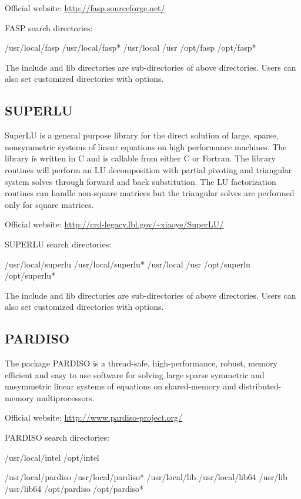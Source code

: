 Official website: \url{http://fasp.sourceforge.net/}

FASP search directories:
\begin{evb}
/usr/local/fasp
/usr/local/fasp*
/usr/local
/usr
/opt/fasp 
/opt/fasp*
\end{evb}
The include and lib directories are sub-directories of above directories. Users can also set customized directories with options.

\subsection{SUPERLU}
SuperLU is a general purpose library for the direct solution of large, sparse, nonsymmetric systems of linear equations on high performance machines. The library is written in C and is callable from either C or Fortran. The library routines will perform an LU decomposition with partial pivoting and triangular system solves through forward and back substitution. The LU factorization routines can handle non-square matrices but the triangular solves are performed only for square matrices.

Official website: \url{http://crd-legacy.lbl.gov/~xiaoye/SuperLU/}

SUPERLU search directories:
\begin{evb}
/usr/local/superlu
/usr/local/superlu*
/usr/local
/usr
/opt/superlu 
/opt/superlu*
\end{evb}

The include and lib directories are sub-directories of above directories. Users can also set customized directories with options.

\subsection{PARDISO}
The package PARDISO is a thread-safe, high-performance, robust, memory efficient and easy to use software for solving large sparse symmetric and unsymmetric linear systems of equations on shared-memory and distributed-memory multiprocessors. 

Official website: \url{http://www.pardiso-project.org/}

PARDISO search directories:
\begin{evb}
/usr/local/intel
/opt/intel

/usr/local/pardiso
/usr/local/pardiso*
/usr/local/lib
/usr/local/lib64 
/usr/lib
/usr/lib64
/opt/pardiso
/opt/pardiso*
\end{evb}

